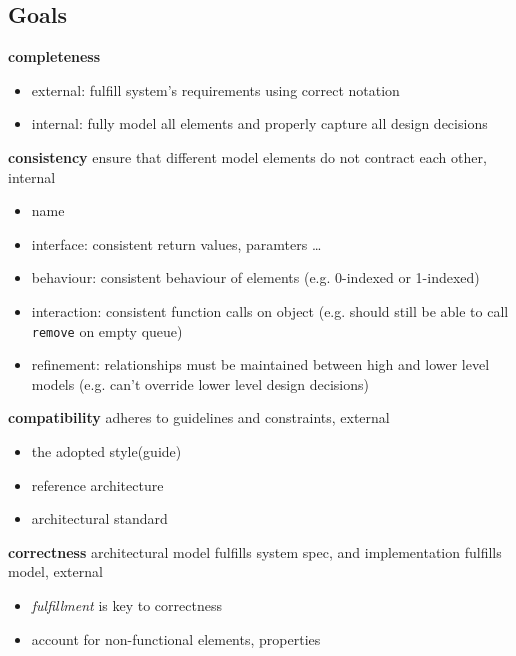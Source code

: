 \documentclass[]{article}
\theoremstyle{definition}
\begin{document}
	\subsection{Goals}
	\textbf{completeness} 
	\begin{itemize}
		\item external: fulfill system's requirements using correct notation
		\item internal: fully model all elements and properly capture all design decisions
	\end{itemize}
	\textbf{consistency} ensure that different model elements do not contract each other, internal
	\begin{itemize}
		\item name
		\item interface: consistent return values, paramters \dots
		\item behaviour: consistent behaviour of elements (e.g. 0-indexed or 1-indexed)
		\item interaction: consistent function calls on object (e.g. should still be able to call \texttt{remove} on empty queue)
		\item refinement: relationships must be maintained between high and lower level models (e.g. can't override lower level design decisions)
	\end{itemize}
	\textbf{compatibility} adheres to guidelines and constraints, external
	\begin{itemize}
		\item the adopted style(guide)
		\item reference architecture
		\item architectural standard
	\end{itemize}
	\textbf{correctness} architectural model fulfills system spec, and implementation fulfills model, external
	\begin{itemize}
		\item \textit{fulfillment} is key to correctness
		\item account for non-functional elements, properties
	\end{itemize}
\end{document}
